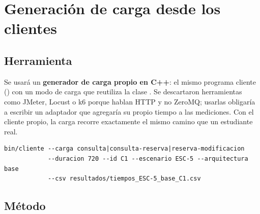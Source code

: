 \section{Generación de carga desde los clientes}
\label{sec:carga}

\subsection{Herramienta}

Se usará un \textbf{generador de carga propio en C++}: el mismo programa cliente
() con un modo de carga que reutiliza la clase .
Se descartaron herramientas como JMeter, Locust o k6 porque hablan HTTP y no
ZeroMQ; usarlas obligaría a escribir un adaptador que agregaría su propio tiempo a
las mediciones. Con el cliente propio, la carga recorre exactamente el mismo camino
que un estudiante real.

\begin{lstlisting}
bin/cliente --carga consulta|consulta-reserva|reserva-modificacion
            --duracion 720 --id C1 --escenario ESC-5 --arquitectura base
            --csv resultados/tiempos_ESC-5_base_C1.csv
\end{lstlisting}

\subsection{Método}

